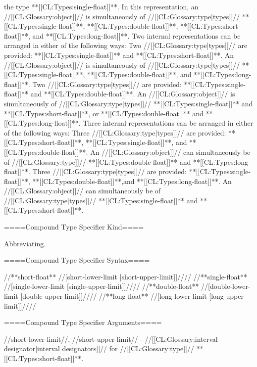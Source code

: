 the type **[[CL:Types:single-float]]**. In this representation, an //[[CL:Glossary:object]]// is simultaneously of //[[CL:Glossary:type|types]]// **[[CL:Types:single-float]]**, **[[CL:Types:double-float]]**, **[[CL:Types:short-float]]**, and **[[CL:Types:long-float]]**. \itemitem{--} Two internal representations can be arranged in either of the following ways: \beginlist \itemitem{\bull} Two //[[CL:Glossary:type|types]]// are provided: **[[CL:Types:single-float]]** and **[[CL:Types:short-float]]**. An //[[CL:Glossary:object]]// is simultaneously of //[[CL:Glossary:type|types]]// **[[CL:Types:single-float]]**, **[[CL:Types:double-float]]**, and **[[CL:Types:long-float]]**. \itemitem{\bull} Two //[[CL:Glossary:type|types]]// are provided: **[[CL:Types:single-float]]** and **[[CL:Types:double-float]]**. An //[[CL:Glossary:object]]// is simultaneously of //[[CL:Glossary:type|types]]// **[[CL:Types:single-float]]** and **[[CL:Types:short-float]]**, or **[[CL:Types:double-float]]** and **[[CL:Types:long-float]]**. \endlist \itemitem{--} Three internal representations can be arranged in either of the following ways: \beginlist \itemitem{\bull} Three //[[CL:Glossary:type|types]]// are provided: **[[CL:Types:short-float]]**, **[[CL:Types:single-float]]**, and **[[CL:Types:double-float]]**. An //[[CL:Glossary:object]]// can simultaneously be of //[[CL:Glossary:type]]// **[[CL:Types:double-float]]** and **[[CL:Types:long-float]]**. \itemitem{\bull} Three //[[CL:Glossary:type|types]]// are provided: **[[CL:Types:single-float]]**, **[[CL:Types:double-float]]**,and **[[CL:Types:long-float]]**. An //[[CL:Glossary:object]]// can simultaneously be of //[[CL:Glossary:type|types]]// **[[CL:Types:single-float]]** and **[[CL:Types:short-float]]**. \endlist \endlist

====Compound Type Specifier Kind====

Abbreviating.

====Compound Type Specifier Syntax====

//**short-float** //[short-lower-limit [short-upper-limit]]//// //**single-float** //[single-lower-limit [single-upper-limit]]//// //**double-float** //[double-lower-limit [double-upper-limit]]//// //**long-float** //[long-lower-limit [long-upper-limit]]////

====Compound Type Specifier Arguments====

//short-lower-limit//, //short-upper-limit// - //[[CL:Glossary:interval designator|interval designators]]// for //[[CL:Glossary:type]]// **[[CL:Types:short-float]]**. 

